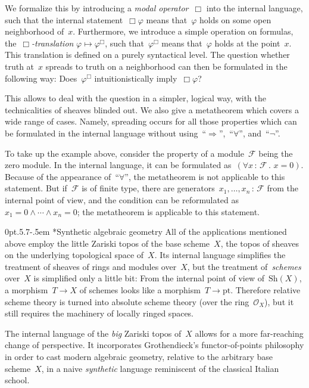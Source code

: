\documentclass[10pt,reqno,a4paper]{amsbook}
\makeatletter
\theoremstyle{definition}
\theoremstyle{plain}
\theoremstyle{remark}
\newcommand{\F}{\mathcal{F}}
\renewcommand{\O}{\mathcal{O}}
\newcommand{\Sh}{\mathrm{Sh}}
\newcommand{\pt}{\mathrm{pt}}
\newcommand{\?}{\,{:}\,}
\renewcommand{\_}{\mathpunct{.}\,}
\def\subsection{\@startsection{subsection}{2}%
  {0pt}{.5\linespacing\@plus.7\linespacing}{-.5em}%
  {\normalfont\bfseries}}
\makeatother
\begin{document}
{We formalize this by introducing a \emph{modal operator}~$\Box$ into the
internal language, such that the internal statement~$\Box\varphi$ means
that~$\varphi$ holds on some open neighborhood of~$x$. Furthermore, we
introduce a simple operation on formulas, the~\emph{$\Box$-translation}
$\varphi \mapsto \varphi^\Box$, such that~$\varphi^\Box$ means that~$\varphi$
holds at the point~$x$. This translation is defined on a purely syntactical
level. The question whether truth at~$x$ spreads to truth on a
neighborhood can then be formulated in the following way: Does~$\varphi^\Box$
intuitionistically imply~$\Box\varphi$?

This allows to deal with the question in a simpler, logical way, with the
technicalities of sheaves blinded out. We also give a metatheorem which
covers a wide range of cases. Namely, spreading occurs for all those properties
which can be formulated in the internal language without
using~``$\Rightarrow$'',~``$\forall$'', and~``$\neg$''.

To take up the example above, consider the property of a module~$\F$ being
the zero module. In the internal language, it can be formulated as~$(\forall x\?\F\_ x = 0)$.
Because of the appearance of~``$\forall$'', the metatheorem is not
applicable to this statement. But if~$\F$ is of finite type, there are
generators~$x_1,\ldots,x_n\?\F$ from the internal point of view, and the
condition can be reformulated as~$x_1 = 0 \wedge \cdots \wedge x_n = 0$; the
metatheorem is applicable to this statement.


\subsection*{Synthetic algebraic geometry}
All of the applications mentioned above employ the little Zariski topos of the base
scheme~$X$, the topos of sheaves on the underlying topological space of~$X$.
Its internal language simplifies the treatment of sheaves of rings and modules
over~$X$, but the treatment of~\emph{schemes} over~$X$ is simplified only a
little bit: From the internal point of view of~$\Sh(X)$, a morphism~$T \to X$
of schemes looks like a morphism~$T \to \pt$. Therefore relative scheme theory
is turned into absolute scheme theory (over the ring~$\O_X$), but it still
requires the machinery of locally ringed spaces.

The internal language of the \emph{big} Zariski topos of~$X$ allows for a more far-reaching
change of perspective. It incorporates Grothendieck's functor-of-points
philosophy in order to cast modern algebraic geometry, relative to the arbitrary
base scheme~$X$, in a naive \emph{synthetic} language reminiscent of the classical
Italian school.

}
\end{document}
